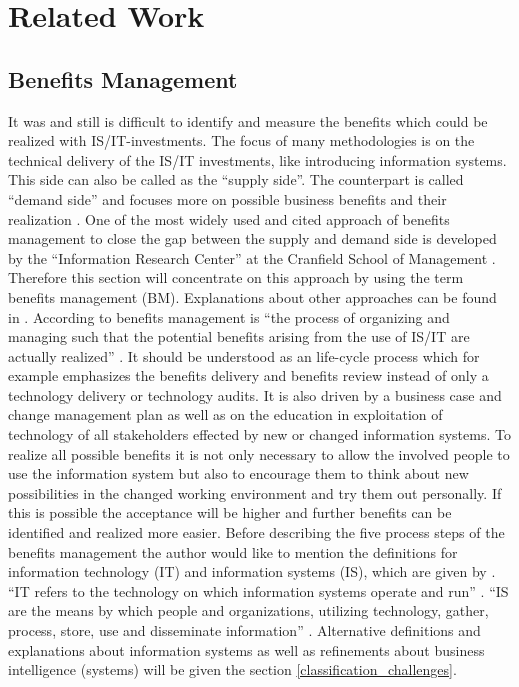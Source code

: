 \chapter{Related Work}
\label{related_work}
\section{Benefits Management}
\label{benefits_management}

It was and still is difficult to identify and measure the benefits which could be realized with IS/IT-investments. The focus of many methodologies is on the technical delivery of the IS/IT investments, like introducing information systems. This side can also be called as the ``supply side''. The counterpart is called ``demand side'' and focuses more on possible business benefits and their realization \citep[p.80]{ward_benefits_2012}. One of the most widely used and cited approach of benefits management to close the gap between the supply and demand side is developed by the ``Information Research Center'' at the Cranfield School of Management \citep[p.555]{braun_benefits_2009}. Therefore this section will concentrate on this approach by using the term benefits management (BM). Explanations about other approaches can be found in \citet[p.61ff.]{banninger_benefits_2004}.
\newline\newline
According to \citet{ward2002} benefits management is ``the process of organizing and managing such that the potential benefits arising from the use of IS/IT are actually realized'' \citep[p.439]{ward2002}. It should be understood as an life-cycle process which for example emphasizes the benefits delivery and benefits review instead of only a technology delivery or technology audits. It is also driven by a business case and change management plan as well as on the education in exploitation of technology of all stakeholders effected by new or changed information systems. To realize all possible benefits it is not only necessary to allow the involved people to use the information system but also to encourage them to think about new possibilities in the changed working environment and try them out personally. If this is possible the acceptance will be higher and further benefits can be identified and realized more easier.\citep[p.9-16]{ward_benefits_2012}
\newline\newline
Before describing the five process steps of the benefits management the author would like to mention the definitions for information technology (IT) and information systems (IS), which are given by \citet{ward_benefits_2012}. ``IT refers to the technology on which information systems operate and run'' \citep[p.17]{ward_benefits_2012}. ``IS are the means by which people and organizations, utilizing technology, gather, process, store, use and disseminate information'' \citep[p.17]{ward_benefits_2012}. Alternative definitions and explanations about information systems as well as refinements about business intelligence (systems) will be given the section \ref{classification_challenges}.

